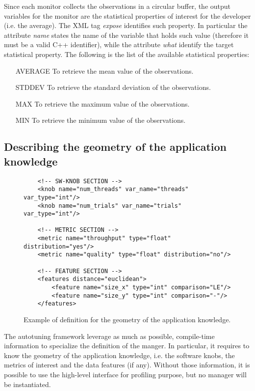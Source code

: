 Since each monitor collects the observations in a circular buffer, the output variables for the monitor are the statistical properties of interest for the developer (i.e. the average).
The XML tag \textit{expose} identifies such property.
In particular the attribute \textit{name} states the name of the variable that holds such value (therefore it must be a valid C++ identifier), while the attribute \textit{what} identify the target statistical property.
The following is the list of the available statistical properties:
\begin{enumerate}
	\item[AVERAGE] To retrieve the mean value of the observations.
	\item[STDDEV] To retrieve the standard deviation of the observations.
	\item[MAX] To retrieve the maximum value of the observations.
	\item[MIN] To retrieve the minimum value of the observations.
\end{enumerate}


\subsection{Describing the geometry of the application knowledge}


\begin{figure}
	\lstset{language=XML}
	\begin{lstlisting}
	<!-- SW-KNOB SECTION -->
	<knob name="num_threads" var_name="threads" var_type="int"/>
	<knob name="num_trials" var_name="trials" var_type="int"/>

	<!-- METRIC SECTION -->
	<metric name="throughput" type="float" distribution="yes"/>
	<metric name="quality" type="float" distribution="no"/>

	<!-- FEATURE SECTION -->
	<features distance="euclidean">
		<feature name="size_x" type="int" comparison="LE"/>
		<feature name="size_y" type="int" comparison="-"/>
	</features>

	\end{lstlisting}
	\caption{Example of definition for the geometry of the application knowledge.}
	\label{code:geometry_xml}
\end{figure}

The autotuning framework leverage as much as possible, compile-time information to specialize the definition of the manger.
In particular, it requires to know the geometry of the application knowledge, i.e. the software knobs, the metrics of interest and the data features (if any).
Without those information, it is possible to use the high-level interface for profiling purpose, but no manager will be instantiated.


